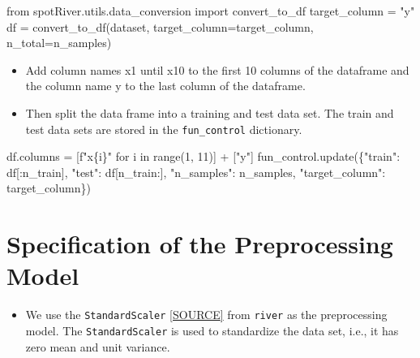 \documentclass[
  letterpaper,
  DIV=11,
  numbers=noendperiod]{scrreprt}
\newenvironment{Shaded}{\begin{snugshade}}{\end{snugshade}}
\newcommand{\BuiltInTok}[1]{\textcolor[rgb]{0.00,0.23,0.31}{#1}}
\newcommand{\ControlFlowTok}[1]{\textcolor[rgb]{0.00,0.23,0.31}{#1}}
\newcommand{\DecValTok}[1]{\textcolor[rgb]{0.68,0.00,0.00}{#1}}
\newcommand{\ImportTok}[1]{\textcolor[rgb]{0.00,0.46,0.62}{#1}}
\newcommand{\KeywordTok}[1]{\textcolor[rgb]{0.00,0.23,0.31}{#1}}
\newcommand{\NormalTok}[1]{\textcolor[rgb]{0.00,0.23,0.31}{#1}}
\newcommand{\OperatorTok}[1]{\textcolor[rgb]{0.37,0.37,0.37}{#1}}
\newcommand{\SpecialCharTok}[1]{\textcolor[rgb]{0.37,0.37,0.37}{#1}}
\newcommand{\SpecialStringTok}[1]{\textcolor[rgb]{0.13,0.47,0.30}{#1}}
\newcommand{\StringTok}[1]{\textcolor[rgb]{0.13,0.47,0.30}{#1}}
\providecommand{\tightlist}{%
  \setlength{\itemsep}{0pt}\setlength{\parskip}{0pt}}\usepackage{longtable,booktabs,array}
\begin{document}
\begin{Shaded}
\begin{Highlighting}[]
\ImportTok{from}\NormalTok{ spotRiver.utils.data\_conversion }\ImportTok{import}\NormalTok{ convert\_to\_df}
\NormalTok{target\_column }\OperatorTok{=} \StringTok{"y"}
\NormalTok{df }\OperatorTok{=}\NormalTok{ convert\_to\_df(dataset, target\_column}\OperatorTok{=}\NormalTok{target\_column, n\_total}\OperatorTok{=}\NormalTok{n\_samples)}
\end{Highlighting}
\end{Shaded}

\begin{itemize}
\tightlist
\item
  Add column names x1 until x10 to the first 10 columns of the dataframe
  and the column name y to the last column of the dataframe.
\item
  Then split the data frame into a training and test data set. The train
  and test data sets are stored in the \texttt{fun\_control} dictionary.
\end{itemize}

\begin{Shaded}
\begin{Highlighting}[]
\NormalTok{df.columns }\OperatorTok{=}\NormalTok{ [}\SpecialStringTok{f"x}\SpecialCharTok{\{}\NormalTok{i}\SpecialCharTok{\}}\SpecialStringTok{"} \ControlFlowTok{for}\NormalTok{ i }\KeywordTok{in} \BuiltInTok{range}\NormalTok{(}\DecValTok{1}\NormalTok{, }\DecValTok{11}\NormalTok{)] }\OperatorTok{+}\NormalTok{ [}\StringTok{"y"}\NormalTok{]}
\NormalTok{fun\_control.update(\{}\StringTok{"train"}\NormalTok{:  df[:n\_train],}
                    \StringTok{"test"}\NormalTok{:  df[n\_train:],}
                    \StringTok{"n\_samples"}\NormalTok{: n\_samples,}
                    \StringTok{"target\_column"}\NormalTok{: target\_column\})}
\end{Highlighting}
\end{Shaded}

\hypertarget{specification-of-the-preprocessing-model-1}{%
\section{Specification of the Preprocessing
Model}\label{specification-of-the-preprocessing-model-1}}

\begin{itemize}
\tightlist
\item
  We use the \texttt{StandardScaler}
  \href{https://riverml.xyz/dev/api/preprocessing/StandardScaler/}{{[}SOURCE{]}}
  from \texttt{river} as the preprocessing model. The
  \texttt{StandardScaler} is used to standardize the data set, i.e., it
  has zero mean and unit variance.
\end{itemize}
\end{document}
